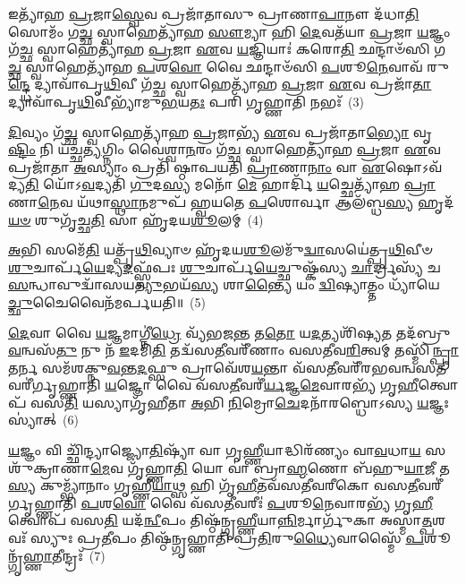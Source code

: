 𑌇𑌤𑍍𑌯𑌾᳴𑌹 \ul{𑌪𑍍𑌰}\-𑌜𑌾\-\ul{𑌸𑍍𑌵𑍇}\-𑌵 𑌪𑍍𑌰𑌜𑌾᳴𑌤𑌾𑌸𑍁 𑌪𑍍𑌰𑌾𑌣𑌾\-\ul{𑌪𑌾}\-𑌨𑍗 𑌦᳴𑌧𑌾\-\ul{𑌤𑌿} 𑌸𑍋𑌮𑌂᳴ 𑌗\-\ul{𑌚𑍍𑌛} 𑌸𑍍𑌵𑌾𑌹𑍇𑌤𑍍𑌯𑌾᳴𑌹 \ul{𑌸𑍗}\-𑌮𑍍𑌯𑌾 𑌹𑌿 \ul{𑌦𑍇}\-𑌵𑌤᳴𑌯𑌾 \ul{𑌪𑍍𑌰}\-𑌜𑌾 \ul{𑌯}\-𑌜𑍍𑌞𑌂 𑌗᳴\-\ul{𑌚𑍍𑌛} 𑌸𑍍𑌵𑌾𑌹𑍇𑌤𑍍𑌯𑌾᳴𑌹 \ul{𑌪𑍍𑌰}\-𑌜𑌾 \ul{𑌏}\-𑌵 \ul{𑌯}\-𑌜𑍍𑌞𑌿𑌯𑌾𑌃॑ 𑌕𑌰𑍋\-\ul{𑌤𑌿} 𑌛𑌨𑍍𑌦𑌾𑍞᳴𑌸𑌿 𑌗\-\ul{𑌚𑍍𑌛} 𑌸𑍍𑌵𑌾𑌹𑍇𑌤𑍍𑌯𑌾᳴𑌹 \ul{𑌪}\-𑌶\-\ul{𑌵𑍋} 𑌵𑍈 𑌛𑌨𑍍𑌦𑌾𑍞᳴𑌸𑌿 \ul{𑌪}\-𑌶𑍂\-\ul{𑌨𑍇}\-𑌵𑌾𑌵᳴ 𑌰𑍁\-\ul{𑌨𑍍𑌦𑍍𑌧𑍇} 𑌦𑍍𑌯𑌾𑌵𑌾᳴𑌪𑍃\-\ul{𑌥𑌿}\-𑌵𑍀 𑌗᳴\-\ul{𑌚𑍍𑌛} 𑌸𑍍𑌵𑌾𑌹𑍇𑌤𑍍𑌯𑌾᳴𑌹 \ul{𑌪𑍍𑌰}\-𑌜𑌾 \ul{𑌏}\-𑌵 𑌪𑍍𑌰𑌜𑌾᳴\-\ul{𑌤𑌾} 𑌦𑍍𑌯𑌾𑌵𑌾᳴𑌪𑍃\-\ul{𑌥𑌿}\-𑌵𑍀𑌭𑍍𑌯𑌾᳴𑌮𑍁\-\ul{𑌭}\-𑌯\-\ul{𑌤𑌃} 𑌪𑌰𑌿᳴ 𑌗𑍃𑌹𑍍𑌣𑌾𑌤𑌿 𑌨𑌭𑌃᳴~(3)

\-\ul{𑌦𑌿}\-𑌵𑍍𑌯𑌂 𑌗᳴\-\ul{𑌚𑍍𑌛} 𑌸𑍍𑌵𑌾𑌹𑍇𑌤𑍍𑌯𑌾᳴𑌹 \ul{𑌪𑍍𑌰}\-𑌜𑌾𑌭𑍍𑌯᳴ \ul{𑌏}\-𑌵 𑌪𑍍𑌰𑌜𑌾᳴𑌤𑌾\-\ul{𑌭𑍍𑌯𑍋} 𑌵𑍃\-\ul{𑌷𑍍𑌟𑌿𑌂} 𑌨𑌿 𑌯᳴𑌚𑍍𑌛\-\ul{𑌤𑍍𑌯}\-𑌗𑍍𑌨𑌿𑌂 𑌵𑍈॑𑌶𑍍𑌵𑌾\-\ul{𑌨}\-𑌰𑌂 𑌗᳴\-\ul{𑌚𑍍𑌛} 𑌸𑍍𑌵𑌾𑌹𑍇𑌤𑍍𑌯𑌾᳴𑌹 \ul{𑌪𑍍𑌰}\-𑌜𑌾 \ul{𑌏}\-𑌵 𑌪𑍍𑌰𑌜𑌾᳴𑌤𑌾 \ul{𑌅}\-𑌸𑍍𑌯𑌾𑌂 𑌪𑍍𑌰𑌤𑌿᳴ 𑌷𑍍𑌠𑌾𑌪𑌯𑌤𑌿 \ul{𑌪𑍍𑌰𑌾}\-𑌣𑌾\-\ul{𑌨𑌾𑌂} 𑌵𑌾 \ul{𑌏}\-𑌷𑍋\-𑌽𑌵᳴ 𑌦𑍍𑌯\-\ul{𑌤𑌿} 𑌯𑍋᳴\-𑌽\-\ul{𑌵}\-𑌦𑍍𑌯𑌤𑌿᳴ \ul{𑌗𑍁}\-𑌦\-\ul{𑌸𑍍𑌯} 𑌮𑌨𑍋᳴ \ul{𑌮𑍇} 𑌹𑌾𑌰𑍍𑌦𑌿᳴ \ul{𑌯}\-𑌚𑍍𑌛𑍇𑌤𑍍𑌯𑌾᳴𑌹 \ul{𑌪𑍍𑌰𑌾}\-𑌣𑌾\-\ul{𑌨𑍇}\-𑌵 𑌯᳴𑌥𑌾\-\ul{𑌸𑍍𑌥𑌾}\-𑌨𑌮𑍁𑌪᳴ 𑌹𑍍𑌵𑌯𑌤𑍇 \ul{𑌪}\-𑌶𑍋𑌰𑍍𑌵𑌾 𑌆𑌲᳴𑌬𑍍𑌧\-\ul{𑌸𑍍𑌯} 𑌹𑍃𑌦᳴\-\ul{𑌯}\-\-\ul{𑍞} 𑌶𑍁𑌗𑍃᳴𑌚𑍍𑌛\-\ul{𑌤𑌿} 𑌸𑌾 𑌹𑍃᳴𑌦𑌯\-\ul{𑌶𑍂}\-𑌲𑌮𑍍~(4)

\-\ul{𑌅}\-𑌭𑌿 𑌸𑌮𑍇᳴\-\ul{𑌤𑌿} 𑌯𑌤𑍍𑌪𑍃᳴\-\ul{𑌥𑌿}\-𑌵𑍍𑌯𑌾𑍞 𑌹𑍃᳴𑌦𑌯\-\ul{𑌶𑍂}\-𑌲𑌮𑍁᳴\-\ul{𑌦𑍍𑌵𑌾}\-𑌸𑌯𑍇॑𑌤𑍍𑌪𑍃\-\ul{𑌥𑌿}\-𑌵𑍀𑍞 \ul{𑌶𑍁}\-𑌚𑌾𑌰𑍍𑌪᳴\-\ul{𑌯𑍇}\-𑌦𑍍𑌯\-\ul{𑌦}\-𑌫𑍍𑌸𑍍𑌵᳴𑌪𑌃 \ul{𑌶𑍁}\-𑌚𑌾𑌰𑍍𑌪᳴\-\ul{𑌯𑍇}\-𑌚𑍍𑌛𑍁𑌷𑍍𑌕᳴𑌸𑍍𑌯 \ul{𑌚𑌾}\-𑌰𑍍𑌦𑍍𑌰𑌸𑍍𑌯᳴ 𑌚 \ul{𑌸}\-𑌨𑍍𑌧𑌾𑌵𑍁𑌦𑍍𑌵𑌾᳴𑌸𑌯\-\ul{𑌤𑍍𑌯𑍁}\-𑌭𑌯᳴\-\ul{𑌸𑍍𑌯} 𑌶𑌾\-\ul{𑌨𑍍𑌤𑍍𑌯𑍈} 𑌯𑌂 \ul{𑌦𑍍𑌵𑌿}\-𑌷𑍍𑌯𑌾𑌤𑍍𑌤𑌂 𑌧𑍍𑌯𑌾᳴𑌯𑍇\-\ul{𑌚𑍍𑌛𑍁}\-𑌚𑍈𑌵𑍈𑌨᳴𑌮𑌰𑍍𑌪𑌯𑌤𑌿॥~(5)

{\anuvakamend[{𑌰𑍇𑌤𑍋᳴ \ul{𑌮𑌿}\-𑌤𑍍𑌰𑌾𑌵𑌰𑍁᳴𑌣𑍗 𑌗\-\ul{𑌚𑍍𑌛} 𑌸𑍍𑌵𑌾\-\ul{𑌹𑌾} 𑌨𑌭𑍋᳴ 𑌹𑍃𑌦𑌯\-\ul{𑌶𑍂}\-𑌲𑌂 𑌦𑍍𑌵𑌾𑌤𑍍𑌰𑌿𑍞᳴𑌶𑌚𑍍𑌚}]}%

\-\ul{𑌦𑍇}\-𑌵𑌾 𑌵𑍈 \ul{𑌯}\-𑌜𑍍𑌞𑌮𑌾𑌗𑍍𑌨𑍀॑\-\ul{𑌧𑍍𑌰𑍇} 𑌵𑍍𑌯᳴𑌭𑌜\-\ul{𑌨𑍍𑌤} 𑌤\-\ul{𑌤𑍋} 𑌯\-\ul{𑌦}\-𑌤𑍍𑌯𑌶𑌿᳴𑌷𑍍𑌯\-\ul{𑌤} 𑌤𑌦᳴𑌬𑍍𑌰𑍁\-\ul{𑌵}\-𑌨𑍍𑌵𑌸᳴\-\ul{𑌤𑍁} 𑌨𑍁 𑌨᳴ \ul{𑌇}\-𑌦𑌮𑌿\-\ul{𑌤𑌿} 𑌤𑌦𑍍𑌵᳴𑌸\-\ul{𑌤𑍀}\-𑌵𑌰𑍀᳴𑌣𑌾𑌂 𑌵𑌸𑌤𑍀𑌵\-\ul{𑌰𑌿}\-𑌤𑍍𑌵𑌮𑍍 𑌤𑌸𑍍𑌮𑌿᳴\-\ul{𑌨𑍍𑌪𑍍𑌰𑌾}\-𑌤𑌰𑍍𑌨 𑌸𑌮᳴𑌶𑌕𑍍𑌨𑍁\-\ul{𑌵}\-𑌨𑍍𑌤\-\ul{𑌦}\-𑌫𑍍𑌸𑍁 𑌪𑍍𑌰𑌾𑌵𑍇᳴𑌶\-\ul{𑌯}\-𑌨𑍍𑌤𑌾 𑌵᳴𑌸\-\ul{𑌤𑍀}\-𑌵𑌰𑍀᳴𑌰𑌭𑌵𑌨𑍍𑌵𑌸\-\ul{𑌤𑍀}\-𑌵𑌰𑍀॑𑌰𑍍𑌗𑍃𑌹𑍍𑌣𑌾𑌤𑌿 \ul{𑌯}\-𑌜𑍍𑌞𑍋 𑌵𑍈 𑌵᳴𑌸\-\ul{𑌤𑍀}\-𑌵𑌰𑍀॑\-\ul{𑌰𑍍𑌯}\-𑌜𑍍𑌞\-\ul{𑌮𑍇}\-𑌵𑌾𑌰𑌭𑍍𑌯᳴ 𑌗𑍃\-\ul{𑌹𑍀}\-𑌤𑍍𑌵𑍋𑌪᳴ 𑌵𑌸\-\ul{𑌤𑌿} 𑌯𑌸𑍍𑌯𑌾𑌗𑍃᳴𑌹𑍀𑌤𑌾 \ul{𑌅}\-𑌭𑌿 \ul{𑌨𑌿}\-𑌮𑍍𑌰𑍋\-\ul{𑌚𑍇}\-𑌦𑌨𑌾᳴𑌰𑌬𑍍𑌧𑍋\-𑌽𑌸𑍍𑌯 \ul{𑌯}\-𑌜𑍍𑌞𑌃 𑌸𑍍𑌯𑌾॑𑌤𑍍~(6)

\-\ul{𑌯}\-𑌜𑍍𑌞𑌂 𑌵𑌿 𑌚𑍍𑌛𑌿᳴𑌨𑍍𑌦𑍍𑌯𑌾𑌜𑍍𑌜𑍍𑌯𑍋\-\ul{𑌤𑌿}\-𑌷𑍍𑌯𑌾᳴ 𑌵𑌾 𑌗𑍃\-\ul{𑌹𑍍𑌣𑍀}\-𑌯𑌾𑌦𑍍𑌧𑌿𑌰᳴𑌣𑍍𑌯𑌂 𑌵𑌾\-\ul{𑌵}\-𑌧𑌾\-\ul{𑌯} 𑌸𑌶𑍁᳴𑌕𑍍𑌰𑌾𑌣𑌾\-\ul{𑌮𑍇}\-𑌵 𑌗𑍃᳴𑌹𑍍𑌣𑌾\-\ul{𑌤𑌿} 𑌯𑍋 𑌵𑌾॑ 𑌬𑍍𑌰𑌾\-\ul{𑌹𑍍𑌮}\-𑌣𑍋 𑌬᳴𑌹𑍁\-\ul{𑌯𑌾}\-𑌜𑍀 𑌤\-\ul{𑌸𑍍𑌯} 𑌕𑍁𑌮𑍍𑌭𑍍𑌯𑌾᳴𑌨𑌾𑌂 𑌗𑍃𑌹𑍍𑌣𑍀\-\ul{𑌯𑌾}\-𑌥𑍍𑌸 𑌹𑌿 𑌗𑍃᳴\-\ul{𑌹𑍀}\-𑌤𑌵᳴𑌸𑌤𑍀𑌵𑌰𑍀𑌕𑍋 𑌵𑌸\-\ul{𑌤𑍀}\-𑌵𑌰𑍀॑𑌰𑍍𑌗𑍃𑌹𑍍𑌣𑌾𑌤𑌿 \ul{𑌪}\-𑌶\-\ul{𑌵𑍋} 𑌵𑍈 𑌵᳴𑌸\-\ul{𑌤𑍀}\-𑌵𑌰𑍀𑌃॑ \ul{𑌪}\-𑌶𑍂\-\ul{𑌨𑍇}\-𑌵𑌾𑌰𑌭𑍍𑌯᳴ 𑌗𑍃\-\ul{𑌹𑍀}\-𑌤𑍍𑌵𑍋𑌪᳴ 𑌵𑌸\-\ul{𑌤𑌿} 𑌯𑌦᳴\-\ul{𑌨𑍍𑌵𑍀}\-𑌪𑌂 𑌤𑌿𑌷𑍍𑌠᳴𑌨𑍍𑌗𑍃\-\ul{𑌹𑍍𑌣𑍀}\-𑌯𑌾\-\ul{𑌨𑍍𑌨𑌿}\-𑌰𑍍𑌮𑌾𑌰𑍍𑌗𑍁᳴𑌕𑌾 𑌅𑌸𑍍𑌮𑌾\-\ul{𑌤𑍍𑌪}\-𑌶𑌵𑌃᳴ 𑌸𑍍𑌯𑍁𑌃 𑌪𑍍𑌰\-\ul{𑌤𑍀}\-𑌪𑌂 𑌤𑌿𑌷𑍍𑌠᳴𑌨𑍍𑌗𑍃𑌹𑍍𑌣𑌾𑌤𑌿 𑌪𑍍𑌰\-\ul{𑌤𑌿}\-𑌰𑍁\-\ul{𑌧𑍍𑌯𑍈}\-𑌵𑌾𑌸𑍍𑌮𑍈᳴ \ul{𑌪}\-𑌶𑍂𑌨𑍍𑌗𑍃᳴\-\ul{𑌹𑍍𑌣𑌾}\-𑌤𑍀𑌨𑍍𑌦𑍍𑌰𑌃᳴~(7)

